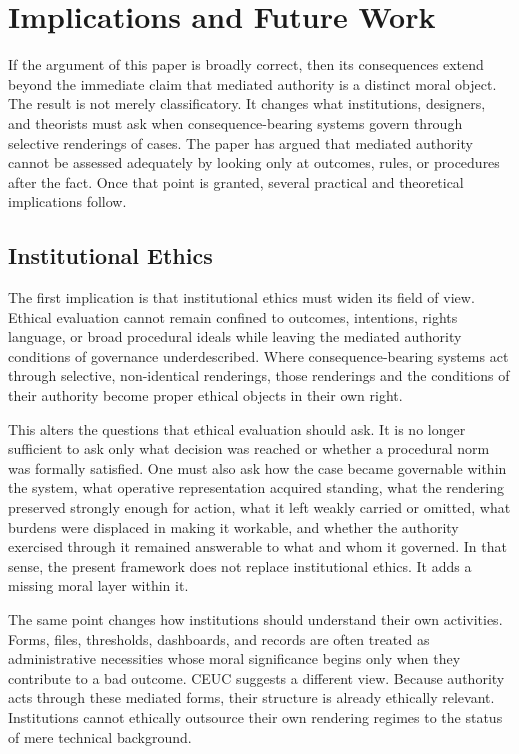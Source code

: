 \documentclass[11pt]{article}
\begin{document}
\section{Implications and Future Work}

If the argument of this paper is broadly correct, then its consequences extend beyond the immediate claim that mediated authority is a distinct moral object. The result is not merely classificatory. It changes what institutions, designers, and theorists must ask when consequence-bearing systems govern through selective renderings of cases. The paper has argued that mediated authority cannot be assessed adequately by looking only at outcomes, rules, or procedures after the fact. Once that point is granted, several practical and theoretical implications follow.

\subsection{Institutional Ethics}

The first implication is that institutional ethics must widen its field of view. Ethical evaluation cannot remain confined to outcomes, intentions, rights language, or broad procedural ideals while leaving the mediated authority conditions of governance underdescribed. Where consequence-bearing systems act through selective, non-identical renderings, those renderings and the conditions of their authority become proper ethical objects in their own right.

This alters the questions that ethical evaluation should ask. It is no longer sufficient to ask only what decision was reached or whether a procedural norm was formally satisfied. One must also ask how the case became governable within the system, what operative representation acquired standing, what the rendering preserved strongly enough for action, what it left weakly carried or omitted, what burdens were displaced in making it workable, and whether the authority exercised through it remained answerable to what and whom it governed. In that sense, the present framework does not replace institutional ethics. It adds a missing moral layer within it.

The same point changes how institutions should understand their own activities. Forms, files, thresholds, dashboards, and records are often treated as administrative necessities whose moral significance begins only when they contribute to a bad outcome. CEUC suggests a different view. Because authority acts through these mediated forms, their structure is already ethically relevant. Institutions cannot ethically outsource their own rendering regimes to the status of mere technical background.
\end{document}

